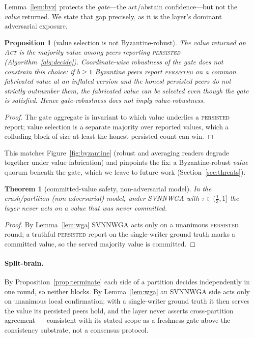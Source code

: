 \documentclass[fleqn,10pt]{wlscirep}
\newtheorem{proposition}{Proposition}
\newtheorem{theorem}{Theorem}
\begin{document}
\noindent Lemma~\ref{lem:byz} protects the \emph{gate}---the act/abstain confidence---but not the
\emph{value} returned. We state that gap precisely, as it is the layer's dominant adversarial exposure.

\begin{proposition}[value selection is not Byzantine-robust]\label{prop:valbyz}
The value returned on \textsc{Act} is the majority value among peers reporting \textsc{persisted}
(Algorithm~\ref{alg:decide}). Coordinate-wise robustness of the gate does not constrain this choice: if
$b\ge1$ Byzantine peers report \textsc{persisted} on a common fabricated value at an inflated version and
the honest persisted peers do not strictly outnumber them, the fabricated value can be selected even
though the gate is satisfied. Hence gate-robustness does not imply value-robustness.
\end{proposition}
\begin{proof}
The gate aggregate is invariant to which value underlies a \textsc{persisted} report; value selection is a
separate majority over reported values, which a colluding block of size at least the honest persisted
count can win.
\end{proof}

\noindent This matches Figure~\ref{fig:byzantine} (robust and averaging readers degrade together under
value fabrication) and pinpoints the fix: a Byzantine-robust \emph{value} quorum beneath the gate, which
we leave to future work (Section~\ref{sec:threats}).

\begin{theorem}[committed-value safety, non-adversarial model]\label{thm:safety}
In the crash/partition (non-adversarial) model, under SVNNWGA with $\tau\in(\tfrac13,1]$ the layer never
acts on a value that was never committed.
\end{theorem}
\begin{proof}
By Lemma~\ref{lem:wga} SVNNWGA acts only on a unanimous \textsc{persisted} round; a truthful
\textsc{persisted} report on the single-writer ground truth marks a committed value, so the served
majority value is committed.
\end{proof}

\paragraph{Split-brain.} By Proposition~\ref{prop:terminate} each side of a partition decides
independently in one round, so neither blocks. By Lemma~\ref{lem:wga} an SVNNWGA side acts only on
unanimous local confirmation; with a single-writer ground truth it then serves the value its persisted
peers hold, and the layer never asserts cross-partition agreement --- consistent with its stated scope as
a freshness gate above the consistency substrate, not a consensus protocol.
\end{document}
